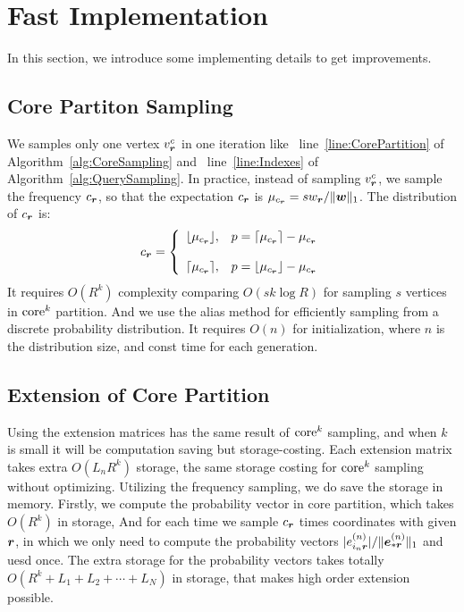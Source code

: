 \documentclass[letterpaper]{article}
\newcommand{\Sca}[3]{{#1}^{(#2)}_{i_#2#3}}%
\newcommand{\V}[1]{{\bm{{\MakeLowercase{#1}}}}}
\newcommand{\VnC}[3]{\V{#1}^{(#2)}_{#3}}
\newcommand{\norm}[2]{\|#1\|_{#2}}
\newcommand{\AlgLine}[2]{line~\ref{line:#2} of Algorithm~\ref{alg:#1}}
\begin{document}
\section{Fast Implementation}
In this section, we introduce some implementing details to get improvements.
\subsection{Core Partiton Sampling}
We samples only one vertex $v^c_\V{r}$ in one iteration like
~\AlgLine{CoreSampling}{CorePartition} and ~\AlgLine{QuerySampling}{Indexes}.
In practice, instead of sampling $v^c_\V{r}$, we sample the frequency $c_\V{r}$,
so that the expectation $c_\V{r}$ is $\mu_{c_\V{r}}=sw_\V{r}/\norm{\V{w}}{1}$.
The distribution of $c_\V{r}$ is:
\begin{equation*}c_\V{r}=
    \left\{
      \begin{array}{ll}
        \lfloor \mu_{c_\V{r}} \rfloor,
        & \hbox{$p=\lceil \mu_{c_\V{r}} \rceil - \mu_{c_\V{r}}$} \\\\
        \lceil \mu_{c_\V{r}} \rceil,
        & \hbox{$p=\lfloor \mu_{c_\V{r}} \rfloor - \mu_{c_\V{r}}$}
      \end{array}
    \right.
\end{equation*}
It requires $O(R^k)$ complexity comparing $O(sk\log{R})$
for sampling $s$ vertices in ${\rm core}^k$ partition.
And we use the alias method\cite{Vose91}
for efficiently sampling from a discrete probability distribution.
It requires $O(n)$ for initialization, where $n$ is the distribution size, and
const time for each generation.
\subsection{Extension of Core Partition}
Using the extension matrices has the same result of ${\rm core}^k$ sampling,
and when $k$ is small it will be computation saving but storage-costing.
Each extension matrix takes extra $O(L_nR^k)$ storage,
the same storage costing for ${\rm core}^k$ sampling without optimizing.
Utilizing the frequency sampling, we do save the storage in memory.
Firstly, we compute the probability vector in core partition, which takes $O(R^k)$ in storage,
And for each time we sample $c_{\V{r}}$ times coordinates with given $\V{r}$,
in which we only need to compute the probability vectors
$|\Sca{e}{n}{\V{r}}|/\norm{\VnC{e}{n}{*\V{r}}}{1}$ and uesd once.
The extra storage for the probability vectors takes totally
$O(R^k + L_1 + L_2 + \cdots + L_N)$ in storage,
that makes high order extension possible.
\end{document}
